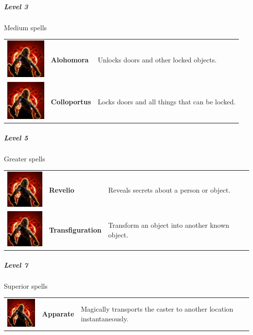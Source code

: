 \subparagraph{Level 3} 
Medium  spells\\
\begin{tabular}{ m{2cm}m{3cm}m{8cm} } 
	\includegraphics[width=2cm]{../Pictures/Gameplay/Spells/Icon/spell_icon.png} & \textbf{Alohomora} & Unlocks doors and other locked objects. \\ 
   \includegraphics[width=2cm]{../Pictures/Gameplay/Spells/Icon/spell_icon.png} & \textbf{Colloportus} &  Locks doors and all things that can be locked. \\ 
\end{tabular}
	

\subparagraph{Level 5} 
Greater spells\\
\begin{tabular}{ m{2cm}m{3cm}m{8cm} } 
	\includegraphics[width=2cm]{../Pictures/Gameplay/Spells/Icon/spell_icon.png} & \textbf{Revelio} & Reveals secrets about a person or object.  \\ 
	\includegraphics[width=2cm]{../Pictures/Gameplay/Spells/Icon/spell_icon.png} & \textbf{Transfiguration} &Transform an object into another known object.\\ 
\end{tabular}


\subparagraph{Level 7} 
Superior  spells\\
\begin{tabular}{ m{2cm}m{3cm}m{8cm} } 
	\includegraphics[width=2cm]{../Pictures/Gameplay/Spells/Icon/spell_icon.png} & \textbf{Apparate} & Magically transports the caster to another location instantaneously.  \\ 
\end{tabular}

